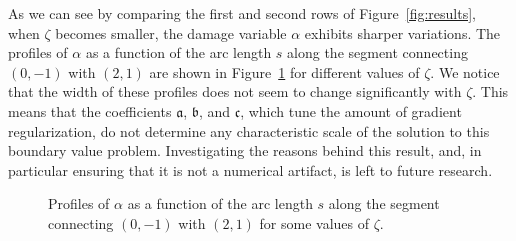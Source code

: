 \documentclass[a4paper,10pt,twoside]{amsbook}
\numberwithin{section}{chapter}
\numberwithin{equation}{chapter}
\theoremstyle{definition}
\begin{document}
As we can see by comparing the first and second rows of Figure~\ref{fig:results}, when $\zeta$ becomes smaller, the damage variable $\alpha$ exhibits sharper variations. The profiles of $\alpha$ as a function of the arc length $s$ along the segment connecting $(0,-1)$ with $(2,1)$ are shown in Figure~\ref{fig:shear-band} for different values of $\zeta$. We notice that the width of these profiles does not seem to change significantly with $\zeta$. This means that the coefficients $\mathfrak{a}$, $\mathfrak{b}$, and $\mathfrak{c}$, which tune the amount of gradient regularization, do not determine any characteristic scale of the solution to this boundary value problem. Investigating the reasons behind this result, and, in particular ensuring that it is not a numerical artifact, is left to future research.
\begin{figure}[h]
\caption{Profiles of $\alpha$ as a function of the arc length $s$ along the segment connecting $(0,-1)$ with $(2,1)$ for some values of $\zeta$.}
\label{fig:shear-band}
\end{figure}
\end{document}

